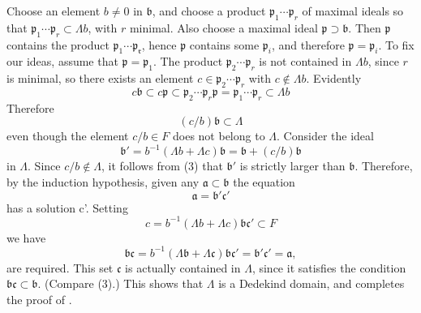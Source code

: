 Choose an element $b \neq 0$ in $\mathfrak{b}$, and choose a product $\mathfrak{p}_{1} \cdots \mathfrak{p}_{r}$ of maximal ideals so that $\mathfrak{p}_{1} \cdots \mathfrak{p}_{r} \subset \Lambda b$, with $r$ minimal. Also choose a maximal ideal $\mathfrak{p} \supset \mathfrak{b}$. Then $\mathfrak{p}$ contains the product $\mathfrak{p}_{1} \cdots \mathfrak{p}_{\mathfrak{r}}$, hence $\mathfrak{p}$ contains some $\mathfrak{p}_{i}$, and therefore $\mathfrak{p}=\mathfrak{p}_{i}$. To fix our ideas, assume that $\mathfrak{p}=\mathfrak{p}_{1}$. The product $\mathfrak{p}_{2} \cdots \mathfrak{p}_{r}$ is not contained in $\Lambda b$, since $r$ is minimal, so there exists an element $c \in \mathfrak{p}_{2} \cdots \mathfrak{p}_{r}$ with $c \notin \Lambda b$. Evidently
\[
	c\mathfrak{b} \subset c\mathfrak{p} \subset \mathfrak{p}_{2} \cdots \mathfrak{p}_{r} \mathfrak{p}=\mathfrak{p}_{1} \cdots \mathfrak{p}_{r} \subset \Lambda b
\]
Therefore
\[
(c / b) \mathfrak{b} \subset \Lambda
\]
even though the element $c / b \in F$ does not belong to $\Lambda$. Consider the ideal
\[
\mathfrak{b}'=b^{-1}(\Lambda b+\Lambda c) \mathfrak{b}=\mathfrak{b}+(c / b) \mathfrak{b}
\]
in $\Lambda$. Since $c / b \notin \Lambda$, it follows from (3) that $\mathfrak{b}'$ is strictly larger than $\mathfrak{b}$. Therefore, by the induction hypothesis, given any $\mathfrak{a} \subset \mathfrak{b}$ the equation
\[
\mathfrak{a}=\mathfrak{b}' \mathfrak{c}'
\]
has a solution c'. Setting
\[
	c=b^{-1}(\Lambda b+\Lambda c) \mathfrak{b}\mathfrak{c}' \subset F
\]
we have
\[
\mathfrak{b} \mathfrak{c}=b^{-1}(\Lambda \mathfrak{b}+\Lambda \mathfrak{c}) \mathfrak{b} \mathfrak{c}'=\mathfrak{b}' \mathfrak{c}'=\mathfrak{a},
\]
are required. This set $\mathfrak{c}$ is actually contained in $\Lambda$, since it satisfies the condition $\mathfrak{b} \mathfrak{c} \subset \mathfrak{b}$. (Compare (3).) This shows that $\Lambda$ is a Dedekind domain, and completes the proof of .
